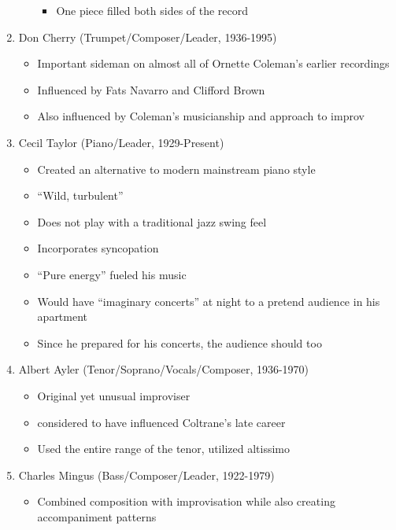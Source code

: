 \documentclass[]{article}
\providecommand{\tightlist}{%
  \setlength{\itemsep}{0pt}\setlength{\parskip}{0pt}}
\begin{document}
\begin{enumerate}
\begin{itemize}
    \begin{itemize}
    \tightlist
    \item
      One piece filled both sides of the record
    \end{itemize}
  \end{itemize}
\item
  Don Cherry (Trumpet/Composer/Leader, 1936-1995)

  \begin{itemize}
  \tightlist
  \item
    Important sideman on almost all of Ornette Coleman's earlier
    recordings
  \item
    Influenced by Fats Navarro and Clifford Brown
  \item
    Also influenced by Coleman's musicianship and approach to improv
  \end{itemize}
\item
  Cecil Taylor (Piano/Leader, 1929-Present)

  \begin{itemize}
  \tightlist
  \item
    Created an alternative to modern mainstream piano style
  \item
    ``Wild, turbulent''
  \item
    Does not play with a traditional jazz swing feel
  \item
    Incorporates syncopation
  \item
    ``Pure energy'' fueled his music
  \item
    Would have ``imaginary concerts'' at night to a pretend audience in
    his apartment
  \item
    Since he prepared for his concerts, the audience should too
  \end{itemize}
\item
  Albert Ayler (Tenor/Soprano/Vocals/Composer, 1936-1970)

  \begin{itemize}
  \tightlist
  \item
    Original yet unusual improviser
  \item
    considered to have influenced Coltrane's late career
  \item
    Used the entire range of the tenor, utilized altissimo
  \end{itemize}
\item
  Charles Mingus (Bass/Composer/Leader, 1922-1979)

  \begin{itemize}
  \tightlist
  \item
    Combined composition with improvisation while also creating
    accompaniment patterns


\end{itemize}
\end{enumerate}
\end{document}
